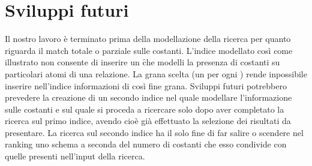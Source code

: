 \section*{Sviluppi futuri}
Il nostro lavoro è terminato prima della modellazione della ricerca per quanto riguarda il match totale o parziale sulle costanti. L'indice modellato così come illustrato non consente di inserire un \f che modelli la presenza di costanti su particolari atomi di una relazione. La grana scelta (un \doc per ogni \se) rende inpossibile inserire nell'indice informazioni di così fine grana.
\noindent Sviluppi futuri potrebbero prevedere la creazione di un secondo indice nel quale modellare l'informazione sulle costanti e sul quale si proceda a ricercare solo dopo aver completato la ricerca sul primo indice, avendo cioè già effettuato la selezione dei risultati da presentare. La ricerca sul secondo indice ha il solo fine di far salire o scendere nel ranking uno schema a seconda del numero di costanti che esso condivide con quelle presenti nell'input della ricerca.


